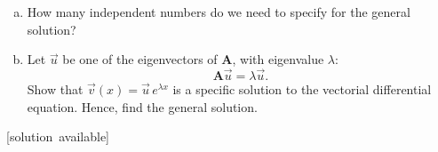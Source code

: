 \documentclass[10pt,a4paper]{article}
\begin{document}
\begin{enumerate}
  \begin{enumerate}[(a)]
  \item
    How many independent numbers do we need to specify for the general
    solution?

  \item
    Let $\vec{u}$ be one of the eigenvectors of $\mathbf{A}$, with
    eigenvalue $\lambda$:
    \begin{equation}
      \mathbf{A} \vec{u} = \lambda \vec{u}.
    \end{equation}
    Show that $\vec{v}(x) = \vec{u}\, e^{\lambda x}$ is a specific
    solution to the vectorial differential equation. Hence, find the
    general solution.
  \end{enumerate}
  \vskip -0.1in
  \hfill{\scriptsize [solution~available]}

\end{enumerate}


    
    
\end{document}
